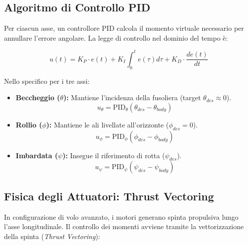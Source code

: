 \subsection{Algoritmo di Controllo PID}
Per ciascun asse, un controllore PID calcola il momento virtuale necessario per annullare l'errore angolare. La legge di controllo nel dominio del tempo è:

\begin{equation}
    u(t) = K_P \cdot e(t) + K_I \int_{0}^{t} e(\tau) d\tau + K_D \cdot \frac{d e(t)}{dt}
\end{equation}

Nello specifico per i tre assi:

\begin{itemize}
    \item \textbf{Beccheggio ($\theta$):} Mantiene l'incidenza della fusoliera (target $\theta_{des} \approx 0$).
    \begin{equation}
        u_\theta = \text{PID}_{\theta}(\theta_{des} - \theta_{body})
    \end{equation}
    
    \item \textbf{Rollio ($\phi$):} Mantiene le ali livellate all'orizzonte ($\phi_{des} = 0$).
    \begin{equation}
        u_\phi = \text{PID}_{\phi}(\phi_{des} - \phi_{body})
    \end{equation}
    
    \item \textbf{Imbardata ($\psi$):} Insegue il riferimento di rotta ($\psi_{des}$).
    \begin{equation}
        u_\psi = \text{PID}_{\psi}(\psi_{des} - \psi_{body})
    \end{equation}
\end{itemize}

\subsection{Fisica degli Attuatori: Thrust Vectoring}
In configurazione di volo avanzato, i motori generano spinta propulsiva lungo l'asse longitudinale. Il controllo dei momenti avviene tramite la vettorizzazione della spinta (\textit{Thrust Vectoring}):

